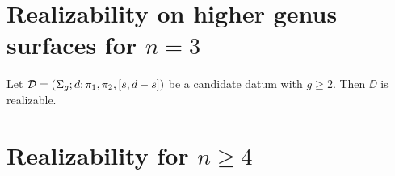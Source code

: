 \section{Realizability on higher genus surfaces for \texorpdfstring{$n=3$}{n=3}}

\begin{theorem}\label{short-partition:th:realizability-on-higher-genus-n-3}
Let $\mathcal{D}=(\Sigma_{g};d;\pi_1,\pi_2,[s,d-s])$ be a candidate datum with $g\ge 2$. Then $\DD$ is realizable.
\end{theorem}

\section{Realizability for \texorpdfstring{$n\ge 4$}{n≥4}}

